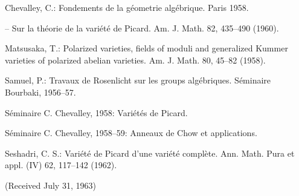 \begin{thebibliography}{99}
 Chevalley, C.: Fondements de la g\'eometrie alg\'ebrique. Paris 1958.

 -- Sur la th\'eorie de la vari\'et\'e de Picard. Am. J. Math. 82, 435--490 (1960).

 Matsusaka, T.: Polarized varieties, fields of moduli and generalized Kummer varieties of polarized abelian varieties. Am. J. Math. 80, 45--82 (1958).

 Samuel, P.: Travaux de Rosenlicht sur les groups alg\'ebriques. S\'eminaire Bourbaki, 1956--57.

 S\'eminaire C. Chevalley, 1958: Vari\'et\'es de Picard.

  S\'eminaire C. Chevalley, 1958--59: Anneaux de Chow et applications.

 Seshadri, C. S.: Vari\'et\'e de Picard d'une vari\'et\'e compl\`ete. Ann. Math. Pura et appl. (IV) 62, 117--142 (1962).
\end{thebibliography}

\centerline{(Received July 31, 1963)}

\vfill\eject
\phantom{a}
\thispagestyle{empty}
